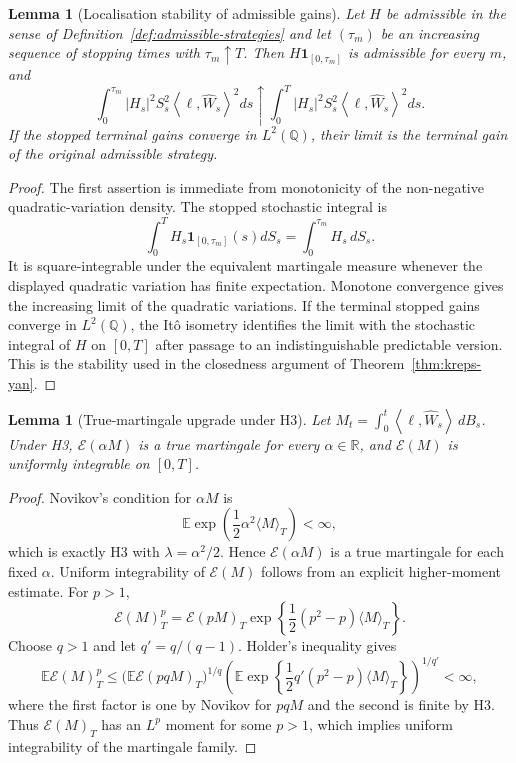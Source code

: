 \documentclass[11pt,oneside]{article}
\theoremstyle{plain}
\newtheorem{lemma}[theorem]{Lemma}
\theoremstyle{definition}
\theoremstyle{remark}
\newcommand{\R}{\mathbb{R}}
\newcommand{\E}{\mathbb{E}}
\newcommand{\Q}{\mathbb{Q}}
\newcommand{\cW}{\widehat W}
\newcommand{\inner}[2]{\left\langle #1,#2\right\rangle}
\begin{document}
\begin{lemma}[Localisation stability of admissible gains]\label{lem:localisation-admissible}
Let $H$ be admissible in the sense of Definition~\ref{def:admissible-strategies} and let $(\tau_m)$ be an increasing sequence of stopping times with $\tau_m\uparrow T$. Then $H\mathbf 1_{[0,\tau_m]}$ is admissible for every $m$, and
\[
\int_0^{\tau_m} |H_s|^2S_s^2\inner{\ell}{\cW_s}^2ds\uparrow
\int_0^T |H_s|^2S_s^2\inner{\ell}{\cW_s}^2ds.
\]
If the stopped terminal gains converge in $L^2(\Q)$, their limit is the terminal gain of the original admissible strategy.
\end{lemma}

\begin{proof}
The first assertion is immediate from monotonicity of the non-negative quadratic-variation density. The stopped stochastic integral is
\[
\int_0^T H_s\mathbf 1_{[0,\tau_m]}(s)dS_s=\int_0^{\tau_m}H_s\,dS_s.
\]
It is square-integrable under the equivalent martingale measure whenever the displayed quadratic variation has finite expectation. Monotone convergence gives the increasing limit of the quadratic variations. If the terminal stopped gains converge in $L^2(\Q)$, the It\^o isometry identifies the limit with the stochastic integral of $H$ on $[0,T]$ after passage to an indistinguishable predictable version. This is the stability used in the closedness argument of Theorem~\ref{thm:kreps-yan}.
\end{proof}

\begin{lemma}[True-martingale upgrade under H3]\label{lem:true-martingale-upgrade}
Let $M_t=\int_0^t\inner{\ell}{\cW_s}\,dB_s$. Under H3, $\mathcal E(\alpha M)$ is a true martingale for every $\alpha\in\R$, and $\mathcal E(M)$ is uniformly integrable on $[0,T]$.
\end{lemma}

\begin{proof}
Novikov's condition for $\alpha M$ is
\[
\E\exp\left(\frac12\alpha^2\langle M\rangle_T\right)<\infty,
\]
which is exactly H3 with $\lambda=\alpha^2/2$. Hence $\mathcal E(\alpha M)$ is a true martingale for each fixed $\alpha$. Uniform integrability of $\mathcal E(M)$ follows from an explicit higher-moment estimate. For $p>1$,
\[
\mathcal E(M)_T^p=\mathcal E(pM)_T\exp\left\{\frac12(p^2-p)\langle M\rangle_T\right\}.
\]
Choose $q>1$ and let $q'=q/(q-1)$. Holder's inequality gives
\[
\E\mathcal E(M)_T^p
\leq
\bigl(\E\mathcal E(pqM)_T\bigr)^{1/q}
\left(\E\exp\left\{\frac12 q'(p^2-p)\langle M\rangle_T\right\}\right)^{1/q'}<\infty,
\]
where the first factor is one by Novikov for $pqM$ and the second is finite by H3. Thus $\mathcal E(M)_T$ has an $L^p$ moment for some $p>1$, which implies uniform integrability of the martingale family.
\end{proof}
\end{document}
